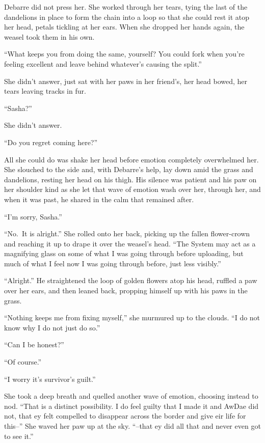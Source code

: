 Debarre did not press her. She worked through her tears, tying the last of the dandelions in place to form the chain into a loop so that she could rest it atop her head, petals tickling at her ears. When she dropped her hands again, the weasel took them in his own.

``What keeps you from doing the same, yourself? You could fork when you're feeling excellent and leave behind whatever's causing the split.''

She didn't answer, just sat with her paws in her friend's, her head bowed, her tears leaving tracks in fur.

``Sasha?''

She didn't answer.

``Do you regret coming here?''

All she could do was shake her head before emotion completely overwhelmed her. She slouched to the side and, with Debarre's help, lay down amid the grass and dandelions, resting her head on his thigh. His silence was patient and his paw on her shoulder kind as she let that wave of emotion wash over her, through her, and when it was past, he shared in the calm that remained after.

``I'm sorry, Sasha.''

``No.~It is alright.'' She rolled onto her back, picking up the fallen flower-crown and reaching it up to drape it over the weasel's head. ``The System may act as a magnifying glass on some of what I was going through before uploading, but much of what I feel now I was going through before, just less visibly.''

``Alright.'' He straightened the loop of golden flowers atop his head, ruffled a paw over her ears, and then leaned back, propping himself up with his paws in the grass.

``Nothing keeps me from fixing myself,'' she murmured up to the clouds. ``I do not know why I do not just do so.''

``Can I be honest?''

``Of course.''

``I worry it's survivor's guilt.''

She took a deep breath and quelled another wave of emotion, choosing instead to nod. ``That is a distinct possibility. I do feel guilty that I made it and AwDae did not, that ey felt compelled to disappear across the border and give eir life for this--'' She waved her paw up at the sky. ``--that ey did all that and never even got to see it.''

